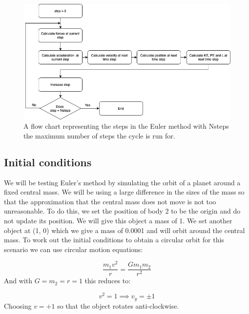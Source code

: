 \documentclass[11pt]{article}
\begin{document}
\begin{figure}[ht]
\centerline{\includegraphics[scale=0.56]{Pictures/EulerMethod.png}}
\caption{A flow chart representing the steps in the Euler method with Nsteps the maximum number of steps the cycle is run for.}
\label{spectrum_ripples}
\end{figure}

\subsection{Initial conditions}

We will be testing Euler's method by simulating the orbit of a planet around a fixed central mass. We will be using a large difference in the sizes of the mass so that the approximation that the central mass does not move is not too unreasonable. To do this, we set the position of body 2 to be the origin and do not update its position. We will give this object a mass of 1. 
We set another object at (1, 0) which we give a mass of 0.0001 and will orbit around the central mass. To work out the initial conditions to obtain a circular orbit for this scenario we can use circular motion equations:

$$
\frac{m_1 v^2}{r} = \frac{G m_1 m_2}{r^2}
$$
And with $G = m_2 = r = 1$ this reduces to:

$$ v^2 = 1 \implies v_y = \pm 1$$
Choosing $v = +1$ so that the object rotates anti-clockwise.

\newpage
\end{document}
